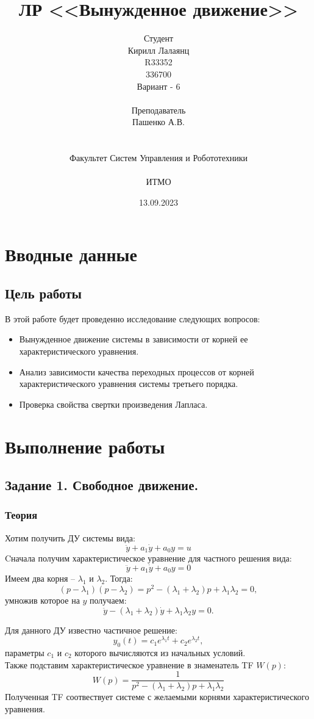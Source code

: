 \documentclass[16pt]{article}
\title{ЛР \textnumero 3 <<Вынужденное движение>>}
\author{
Студент \\
Кирилл Лалаянц\\
R33352\\
336700\\
Вариант - 6\\
\\
Преподаватель\\
Пашенко А.В. \\
\\
\\
Факультет Систем Управления и Робототехники\\
\\
ИТМО\\
}
\date{13.09.2023}
\begin{document}
\maketitle
\newpage
\tableofcontents
\thispagestyle{empty}

\newpage
\setcounter{page}{1}
\section{Вводные данные}
\subsection{Цель работы}
В этой работе будет проведенно исследование следующих вопросов:
\begin{itemize}
    \item Вынужденное движение системы в зависимости от корней ее характеристического уравнения. 
    \item Анализ зависимости качества переходных процессов от корней характеристического уравнения системы третьего порядка. 
    \item Проверка свойства свертки произведения Лапласа. 
\end{itemize} 

\newpage
\section{Выполнение работы}
\label{sec:headings}


\subsection{Задание 1. Свободное движение.}

\subsubsection{Теория}
Хотим получить ДУ системы вида:
\[\ddot{y} + a_1\dot{y} + a_0y = u\]
Cначала получим характеристическое уравнение для частного решения вида:
\[\ddot{y} + a_1\dot{y} + a_0y = 0\]
Имеем два корня -- \(\lambda_1\) и \(\lambda_2\). Тогда:
\[ (p - \lambda_1)(p-\lambda_2) = p^2 - (\lambda_1 + \lambda_2)p + \lambda_1\lambda_2 = 0,\]
умножив которое на \(y\) получаем:
\[\ddot{y} - (\lambda_1 + \lambda_2)\dot{y} + \lambda_1\lambda_2y = 0.\]

Для данного ДУ известно частичное решение:
\[ y_{0}(t) = c_1 e^{\lambda_1 t} + c_2 e^{\lambda_2 t},\]
параметры \(c_1\) и \(c_2\) которого вычисляются из начальных условий.
\\
Также подставим характеристическое уравнение в знаменатель TF \(W(p)\):
\[W(p) = \frac{1}{p^2 - (\lambda_1 + \lambda_2)p + \lambda_1\lambda_2}\]
Полученная TF соотвествует системе с желаемыми корнями характеристического уравнения.
\end{document}

